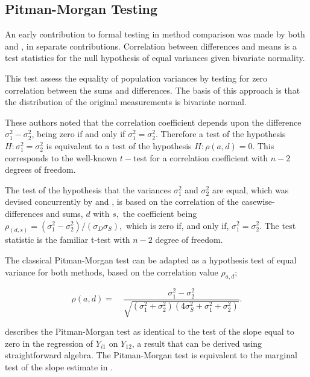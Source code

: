 \documentclass[12pt, a4paper]{report}
\theoremstyle{plain}
\theoremstyle{definition}
\theoremstyle{remark}
\begin{document}





\subsection{Pitman-Morgan Testing}
An early contribution to formal testing in method comparison was
made by both \citet{morgan} and \citet{pitman}, in separate
contributions. Correlation between differences and means is a test statistics for the null hypothesis of equal variances given bivariate normality. 

This test assess the equality
of population variances by testing for zero correlation between the sums and differences. The basis of this approach is that the distribution of the original measurements is bivariate normal.

These authors noted that the correlation coefficient depends
upon the difference $\sigma^{2}_{1}- \sigma^{2}_{2}$, being zero
if and only if $\sigma^{2}_{1}=\sigma^{2}_{2}$.
Therefore a test of the hypothesis $H: \sigma^{2}_{1}=\sigma^{2}_{2}$ is equivalent to a test of the hypothesis $H: \rho(a,d) = 0$. This corresponds to the well-known $t-$test for a correlation coefficient with $n-2$ degrees of freedom. 

The test of the hypothesis that the variances $\sigma^2_1$ and $\sigma^2_2$ are equal, which was devised concurrently by \citet{pitman} and \citet{morgan}, 
is based on the correlation of the casewise-differences and sums, $d$ with $s,$ the coefficient being $ \rho_{(d,s)} = (\sigma^2_1 -\sigma^2_2) / ( \sigma_D \sigma_S ),$ which is zero if, and only
if, $\sigma^2_1 = \sigma^2_2.$ The test statistic is the familiar t-test with $n-2$ degree of freedom. 



The classical Pitman-Morgan test can be adapted as a hypothesis test of equal variance for both methods, based on the correlation value $\rho_{a,d}$;

\begin{equation}
\rho(a,d)=\quad\frac{\sigma^{2}_{1}-\sigma^{2}_{2}}{\sqrt{(\sigma^{2}_{1}+\sigma^{2}_{2})(4\sigma^{2}_{S}+\sigma^{2}_{1}+\sigma^{2}_{2})}}.
\end{equation}

\citet{Bartko} describes the Pitman-Morgan test as identical to the test of the slope equal to zero in the regression of $Y_{i1}$ on $Y_{12}$, a result that can be derived using straightforward algebra. The Pitman-Morgan test is equivalent to the marginal test of the slope estimate in \citet{BB89}.
\end{document}
